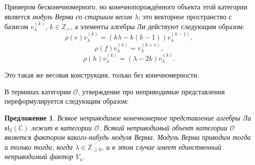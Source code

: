 \documentclass[12pt]{article}
\newtheorem{predl}[theorem]{Предложение}
\theoremstyle{definition}
\begin{document}
Примером бесконечномерного, но конечнопорождённого объекта этой категории является \textit{модуль Верма со старшим весом $\lambda$}: это векторное пространство с базисом $v_{\lambda} ^ {(k)}$, $k \in \mathbb{Z}_+$, а элементы алгебры Ли действуют следующим образом:
$$ \rho(e) v_{\lambda} ^ {(k)} = (k \lambda - k (k - 1)) v_{\lambda} ^ {(k-1)}, $$
$$ \rho(f) v_{\lambda} ^ {(k)} = v_{\lambda} ^ {(k+1)}, $$
$$ \rho(h) v_{\lambda} ^ {(k)} = (\lambda - 2k) v_{\lambda} ^ {(k)}. $$

Это такая же весовая конструкция, только без конечномерности.

В терминах категории $\mathcal{O}$, утверждение про неприводимые представления переформулируется следующим образом:
\begin{predl}
    Всякое неприводимое конечномерное представление алгебры Ли $\mathfrak{sl_2}(\mathbb{C})$ лежит в категории $\mathcal{O}$. Всякий неприводимый объект категории $\mathcal{O}$ является фактором какого-нибудь модуля Верма. Модуль Верма приводим тогда и только тогда, когда $\lambda \in \mathbb{Z}_{\ge 0}$, и в этом случае имеет единственный неприводимый фактор $V_n$.
\end{predl}
    
\end{document}
